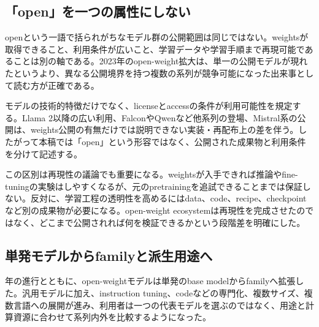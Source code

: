 
\subsection{「open」を一つの属性にしない}

openという一語で括られがちなモデル群の公開範囲は同じではない。weightsが取得できること、利用条件が広いこと、学習データや学習手順まで再現可能であることは別の軸である。2023年のopen-weight拡大は、単一の公開モデルが現れたというより、異なる公開境界を持つ複数の系列が競争可能になった出来事として読む方が正確である。\autocite{src-00c370ab2324,src-1fd43f93adcc,src-240ca564b6b8,src-3db09fede330,src-5c8e2db8871a,src-74aa7e2a7ca4,src-81f670ec1e74,src-8bdb904686fb,src-9df482e2c96c,src-b7e5243e6d59,src-bc7aba201f01,src-d4b6359bbad1,src-dd2cfa98160d,src-f0349196879e}


モデルの技術的特徴だけでなく、licenseとaccessの条件が利用可能性を規定する。Llama 2以降の広い利用、FalconやQwenなど他系列の登場、Mistral系の公開は、weights公開の有無だけでは説明できない実装・再配布上の差を伴う。したがって本稿では「open」という形容ではなく、公開された成果物と利用条件を分けて記述する。\autocite{src-00c370ab2324,src-1fd43f93adcc,src-240ca564b6b8,src-3db09fede330,src-5c8e2db8871a,src-74aa7e2a7ca4,src-81f670ec1e74,src-8bdb904686fb,src-9df482e2c96c,src-b7e5243e6d59,src-bc7aba201f01,src-d4b6359bbad1,src-dd2cfa98160d,src-f0349196879e}


この区別は再現性の議論でも重要になる。weightsが入手できれば推論やfine-tuningの実験はしやすくなるが、元のpretrainingを追試できることまでは保証しない。反対に、学習工程の透明性を高めるにはdata、code、recipe、checkpointなど別の成果物が必要になる。open-weight ecosystemは再現性を完成させたのではなく、どこまで公開されれば何を検証できるかという段階差を明確にした。\autocite{src-240ca564b6b8,src-3db09fede330,src-5c8e2db8871a,src-8bdb904686fb,src-9df482e2c96c,src-b7e5243e6d59,src-bc7aba201f01,src-d4b6359bbad1}


\subsection{単発モデルからfamilyと派生用途へ}

年の進行とともに、open-weightモデルは単発のbase modelからfamilyへ拡張した。汎用モデルに加え、instruction tuning、codeなどの専門化、複数サイズ、複数言語への展開が進み、利用者は一つの代表モデルを選ぶのではなく、用途と計算資源に合わせて系列内外を比較するようになった。\autocite{src-00c370ab2324,src-240ca564b6b8,src-3db09fede330,src-5c8e2db8871a,src-8bdb904686fb,src-9df482e2c96c,src-b7e5243e6d59,src-bc7aba201f01,src-d4b6359bbad1,src-dd2cfa98160d,src-f0349196879e}


